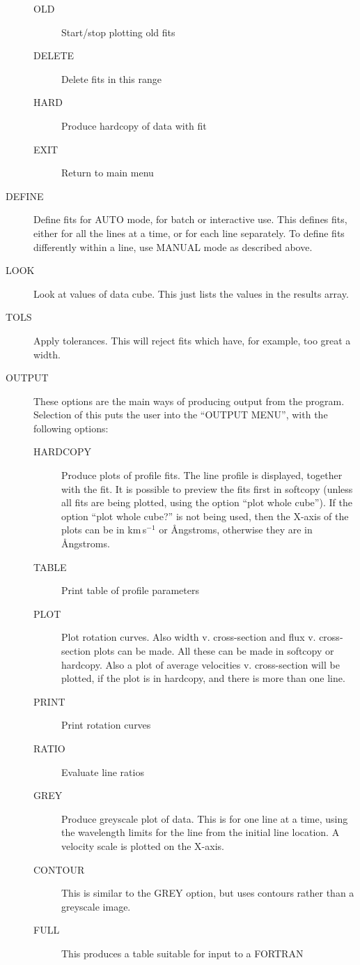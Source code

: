 \documentclass[11pt,twoside]{article}
\begin{document}
\begin{description}
\begin{description}
\item[OLD] Start/stop plotting old fits
\item[DELETE] Delete fits in this range
\item[HARD] Produce hardcopy of data with fit
\item[EXIT] Return to main menu
\end{description}
\item[DEFINE] Define fits for AUTO mode, for batch or interactive use.
This defines fits, either for all the lines at a time, or for each line
separately.
To define fits differently within a line, use MANUAL mode as described
above.
\item[LOOK] Look at values of data cube.
This just lists the values in the results array.
\item[TOLS] Apply tolerances.
This will reject fits which have, for example, too great a width.
\item[OUTPUT] These options are the main ways of producing output
from the program.
Selection of this puts the user into the ``OUTPUT MENU'', with the
following options:
\begin{description}
\item[HARDCOPY] Produce plots of profile fits.
The line profile is displayed, together with the fit.
It is possible to preview the fits first in softcopy (unless all fits
are being plotted, using the option ``plot whole cube'').
If the option ``plot whole cube?'' is not being used, then the X-axis of
the plots can be in km\,s$^{-1}$ or {\AA}ngstroms, otherwise they are in
{\AA}ngstroms.
\item[TABLE] Print table of profile parameters
\item[PLOT] Plot rotation curves.
Also width v. cross-section and flux v. cross-section plots can be made.
All these can be made in softcopy or hardcopy.
Also a plot of average velocities v. cross-section will be plotted, if
the plot is in hardcopy, and there is more than one line.
\item[PRINT] Print rotation curves
\item[RATIO] Evaluate line ratios
\item[GREY] Produce greyscale plot of data.
This is for one line at a time, using the wavelength limits for the line
from the initial line location.
A velocity scale is plotted on the X-axis.
\item[CONTOUR] This is similar to the GREY option, but uses contours
rather than a greyscale image.
\item[FULL] This produces a table suitable for input to a FORTRAN

\end{description}
\end{description}
\end{document}
